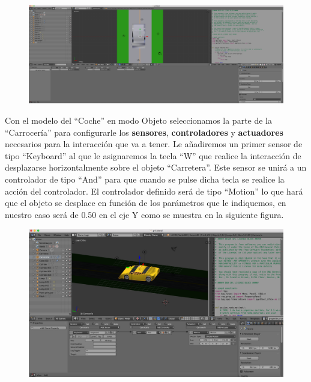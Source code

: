 \documentclass[10pt]{article}
\begin{document}
\begin{figure}[H]
	\begin{center}
	 		\includegraphics[width = 1.00\textwidth]{Imagenes/p4-img2}
	\end{center} 
\end{figure}

Con el modelo del ``Coche'' en modo Objeto seleccionamos la parte de la ``Carrocería'' para configurarle los \textbf{sensores}, \textbf{controladores} y \textbf{actuadores} necesarios para la interacción que va a tener. Le añadiremos un primer sensor de tipo ``Keyboard'' al que le asignaremos la tecla ``W'' que realice la interacción de desplazarse horizontalmente sobre el objeto ``Carretera''. Este sensor se unirá a un controlador de tipo ``And'' para que cuando se pulse dicha tecla se realice la acción del controlador. El controlador definido será de tipo ``Motion'' lo que hará que el objeto se desplace en función de los parámetros que le indiquemos, en nuestro caso será de 0.50 en el eje Y como se muestra en la siguiente figura. \\

\begin{figure}[H]
	\begin{center}
	 		\includegraphics[width = 1.00\textwidth]{Imagenes/p4-img3}
	\end{center} 
\end{figure}
\end{document}
